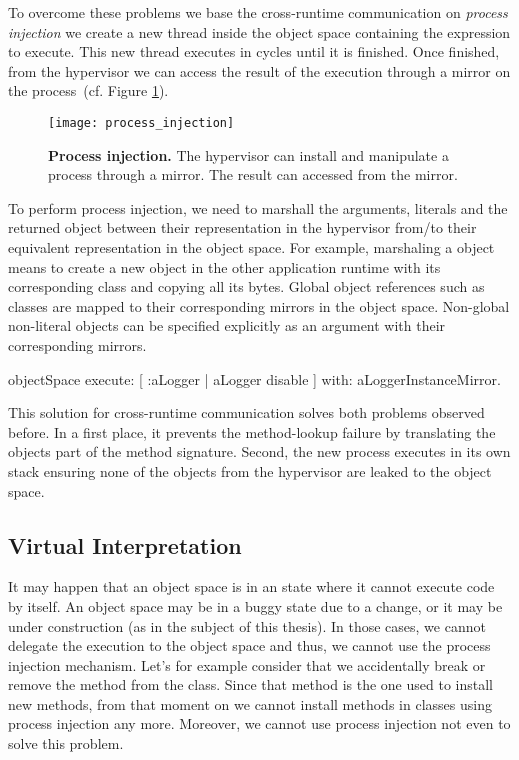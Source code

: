 To overcome these problems we base the cross-runtime communication on \emph{process injection} \ie we create a new thread inside the object space containing the expression to execute. This new thread executes in cycles until it is finished. Once finished, from the hypervisor we can access the result of the execution through a mirror on the process~(cf. Figure \ref{fig:process_injection}).

\begin{figure}[ht]
\center
\texttt{[image: process\_injection]}
\caption{\textbf{Process injection.} The hypervisor can install and manipulate a process through a mirror. The result can accessed from the mirror.\label{fig:process_injection}}
\end{figure}

To perform process injection, we need to marshall the arguments, literals and the returned object between their representation in the hypervisor from/to their equivalent representation in the object space. For example, marshaling a  object means to create a new  object in the other application runtime with its corresponding class and copying all its bytes. Global object references such as classes are mapped to their corresponding mirrors in the object space. Non-global non-literal objects can be specified explicitly as an argument with their corresponding mirrors.

\begin{code}
objectSpace
	execute: [ :aLogger | aLogger disable ]
	with: aLoggerInstanceMirror.
\end{code}

This solution for cross-runtime communication solves both problems observed before. In a first place, it prevents the method-lookup failure by translating the objects part of the method signature. Second, the new process executes in its own stack ensuring none of the objects from the hypervisor are leaked to the object space.

\subsection{Virtual Interpretation} \label{sec:interpretation}

It may happen that an object space is in an state where it cannot execute code by itself. An object space may be in a buggy state due to a change, or it may be under construction (as in the subject of this thesis). In those cases, we cannot delegate the execution to the object space and thus, we cannot use the process injection mechanism. Let's for example consider that we accidentally break or remove the  method from the  class. Since that method is the one used to install new methods, from that moment on we cannot install methods in classes using process injection any more. Moreover, we cannot use process injection not even to solve this problem.

